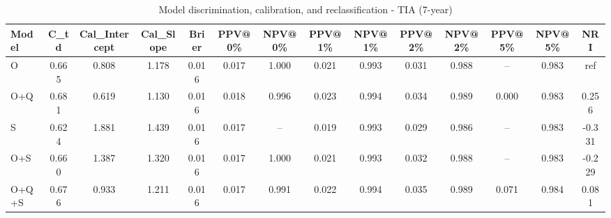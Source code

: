 \begin{table}[htbp]
\centering
\small
\caption{Model discrimination, calibration, and reclassification - TIA (7-year)}
\label{tab:perf_tia_7y}
\begin{tabular}{lccccccccccccc}
\toprule
Model & C\_td & Cal\_Intercept & Cal\_Slope & Brier & PPV@0\% & NPV@0\% & PPV@1\% & NPV@1\% & PPV@2\% & NPV@2\% & PPV@5\% & NPV@5\% & NRI \\
\midrule
O & 0.665 & 0.808 & 1.178 & 0.016 & 0.017 & 1.000 & 0.021 & 0.993 & 0.031 & 0.988 & -- & 0.983 & ref \\
O+Q & 0.681 & 0.619 & 1.130 & 0.016 & 0.018 & 0.996 & 0.023 & 0.994 & 0.034 & 0.989 & 0.000 & 0.983 & 0.256 \\
S & 0.624 & 1.881 & 1.439 & 0.016 & 0.017 & -- & 0.019 & 0.993 & 0.029 & 0.986 & -- & 0.983 & -0.331 \\
O+S & 0.660 & 1.387 & 1.320 & 0.016 & 0.017 & 1.000 & 0.021 & 0.993 & 0.032 & 0.988 & -- & 0.983 & -0.229 \\
O+Q+S & 0.676 & 0.933 & 1.211 & 0.016 & 0.017 & 0.991 & 0.022 & 0.994 & 0.035 & 0.989 & 0.071 & 0.984 & 0.081 \\
\bottomrule
\end{tabular}
\end{table}